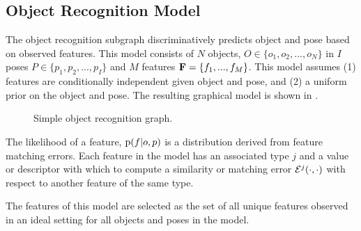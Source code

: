     \subsection{Object Recognition Model}
        The object recognition subgraph discriminatively predicts object and pose based on observed features. This model consists of $N$ objects, $O \in \{o_1,o_2, ..., o_N\}$ in $I$ poses $P \in \{p_1,p_2, ..., p_I\}$ and 
        $M$ features $\mathbf{F} = \left\{ f_1, ...,  f_M\right\}$. 
        This model assumes (1) features are conditionally independent given object and pose, and (2) a uniform prior on the object and pose. The resulting graphical model is shown in .
        \begin{figure}[h]
          \centering
          \caption{Simple object recognition graph.}
          \label{fig:objectRecognitionSubgraph}
        \end{figure}

        The likelihood of a feature, $\text{p}(f|o,p)$ is a distribution derived from feature matching errors. Each feature in the model has an associated type $j$ and a value or descriptor with which to compute a similarity or matching error $\mathcal{E}^j(\cdot,\cdot)$ with respect to another feature of the same type.

        The features of this model are selected as the set of all unique features observed in an ideal setting for all objects and poses in the model. 


